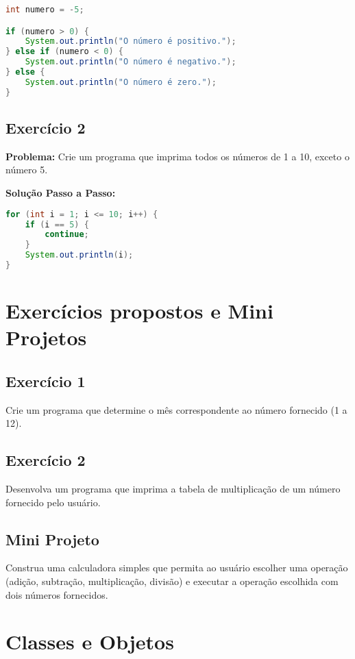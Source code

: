 \documentclass[a4paper,12pt]{book}
\begin{document}
\begin{lstlisting}[language=Java]
int numero = -5;

if (numero > 0) {
    System.out.println("O número é positivo.");
} else if (numero < 0) {
    System.out.println("O número é negativo.");
} else {
    System.out.println("O número é zero.");
}
\end{lstlisting}

\subsection{Exercício 2}

\textbf{Problema:} Crie um programa que imprima todos os números de 1 a 10, exceto o número 5.

\textbf{Solução Passo a Passo:}

\begin{lstlisting}[language=Java]
for (int i = 1; i <= 10; i++) {
    if (i == 5) {
        continue;
    }
    System.out.println(i);
}
\end{lstlisting}

\section{Exercícios propostos e Mini Projetos}

\subsection{Exercício 1}

Crie um programa que determine o mês correspondente ao número fornecido (1 a 12).

\subsection{Exercício 2}

Desenvolva um programa que imprima a tabela de multiplicação de um número fornecido pelo usuário.

\subsection{Mini Projeto}

Construa uma calculadora simples que permita ao usuário escolher uma operação (adição, subtração, multiplicação, divisão) e executar a operação escolhida com dois números fornecidos.


\section{Classes e Objetos}
\end{document}
